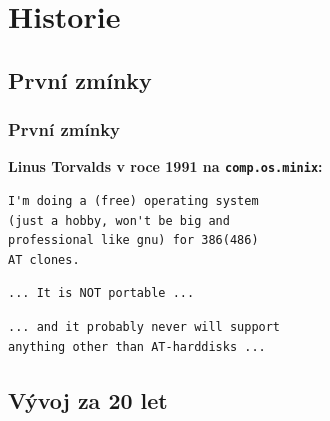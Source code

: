 \documentclass[xcolor=dvipsnames,handout]{beamer}
\newcommand{\heading}[1]{\textbf{\textcolor{BurntOrange}{#1}}}
\begin{document}
\section{Historie}
\frame{\sectionpage}

\subsection{První zmínky}

\begin{frame}[fragile]
  \frametitle{První zmínky}

  \heading{Linus Torvalds v roce 1991 na \texttt{comp.os.minix}:}
\begin{verbatim}
I'm doing a (free) operating system
(just a hobby, won't be big and
professional like gnu) for 386(486)
AT clones.
\end{verbatim}

\pause

\begin{verbatim}
... It is NOT portable ...
\end{verbatim}

\pause

\begin{verbatim}
... and it probably never will support
anything other than AT-harddisks ...
\end{verbatim}

\end{frame}

\subsection{Vývoj za 20 let}
\end{document}
